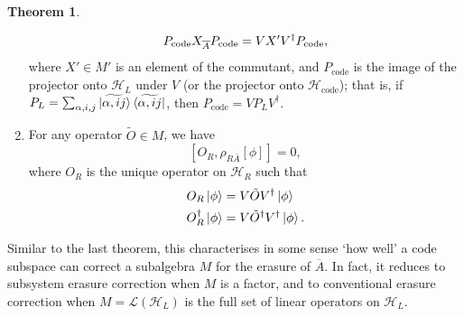 \documentclass[12pt,a4paper]{report}
\numberwithin{equation}{section}
\newcommand{\ketbra}[2]{\ket{#1}\bra{#2}}
\newcommand{\ketbras}[1]{\ketbra{#1}{#1}}
\newcommand{\Pc}{P_{\text{code}}}
\newcommand{\Hcode}{\mathcal{H}_{\text{code}}}
\newcommand{\ol}[1]{\overline{#1}}
\theoremstyle{definition}
\theoremstyle{theorem}
\newtheorem{theorem}{Theorem}[section]
\theoremstyle{theorem}
\theoremstyle{example}
\theoremstyle{definition}
\begin{document}
\begin{theorem}
\begin{enumerate}
		\begin{equation}\label{O3}
			\Pc\Xabar\Pc=VX'V^{\dagger}\Pc,
		\end{equation}
		where $X'\in M'$ is an element of the commutant, and $\Pc$ is the image of the projector onto $\mathcal{H}_{L}$ under $V$ (or the projector onto $\Hcode$); that is, if $P_{L}=\sum_{\alpha,i,j}\ketbras{\widetilde{\alpha,ij}}$, then $\Pc=VP_{L}V^{\dagger}$.
		\item For any operator $\tilde{O}\in M$, we have
		\begin{equation}\label{O4}
			[O_{R},\rho_{R\ol{A}}[\phi]]=0,
		\end{equation}
		where $O_{R}$ is the unique operator on $\mathcal{H}_{R}$ such that
		\begin{equation}\label{O5}
			\begin{aligned}
				O_{R}\ket{\phi}&=V\tilde{O}V^{\dagger}\ket{\phi}\\
				O_{R}^{\dagger}\ket{\phi}&=V\tilde{O}^{\dagger}V^{\dagger}\ket{\phi}.
			\end{aligned}
		\end{equation}
	\end{enumerate}
\end{theorem}
Similar to the last theorem, this characterises in some sense `how well' a code subspace can correct a subalgebra $M$ for the erasure of $\ol{A}$. In fact, it reduces to subsystem erasure correction when $M$ is a factor, and to conventional erasure correction when $M=\mathcal{L}(\mathcal{H}_{L})$ is the full set of linear operators on $\mathcal{H}_{L}$.
\end{document}
